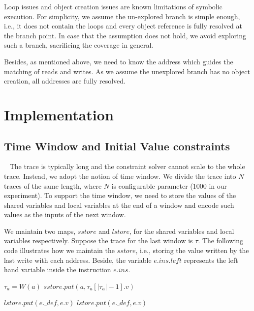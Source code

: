 Loop issues and object creation issues are known limitations of symbolic execution. For simplicity, we assume the un-explored branch is simple enough, i.e., it does not contain the loops and every object reference is fully resolved at the branch point. In case that the assumption does not hold, we avoid exploring such a branch, sacrificing the coverage in general. 

Besides, as mentioned above, we need to know the address which guides the matching of reads and writes. As we assume the unexplored branch has no object creation, all addresses are fully resolved.




\section{Implementation}\label{sec:impl}


\subsection{Time Window and Initial Value constraints}~\label{sec:timewindow}
The trace is typically long and the constraint solver cannot scale to the whole trace. Instead, we adopt the notion of time window. 
We divide the trace into $N$ traces of the same length, where $N$ is configurable parameter (1000 in our experiment). To support the time window, we need to store the values of the shared variables and local variables at the end of a window and encode such values as the inputs of the next window. 

We maintain two maps,  $sstore$ and $lstore$, for the shared variables and local variables respectively. Suppose the trace for the last window is $\tau$. The following code illustrates how we maintain the $sstore$, i.e., storing the value written by the last write with each address. Beside, the variable $e.ins.left$ represents the left hand variable inside the instruction $e.ins$.

\begin{algorithmic}[3]
 \State $\tau_a=W(a)$
 \State $sstore.put(a,\tau_a[|\tau_a|-1].v)$ 
\EndFor
\end{algorithmic}

\begin{algorithmic}[3]
    \State $ lstore.put(e.\_def, e.v)$
  \Else
        \State $ lstore.put(e.\_def, e.v)$
     \EndIf
  \EndIf 
\EndFor
\end{algorithmic}


